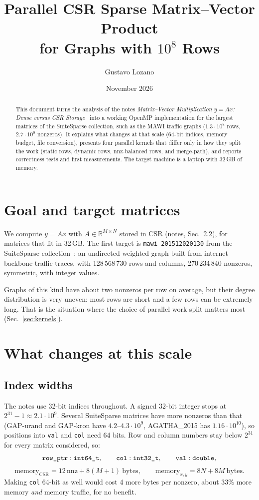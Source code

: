 \documentclass[11pt,a4paper]{article}
\title{\textbf{Parallel CSR Sparse Matrix--Vector Product\\for Graphs with $10^8$ Rows}}
\author{Gustavo Lozano}
\date{November 2026}
\newcommand{\R}{\mathbb{R}}
\begin{document}
\maketitle

\begin{abstract}
This document turns the analysis of the notes \emph{Matrix--Vector Multiplication
$y=Ax$: Dense versus CSR Storage}~\cite{notes} into a working OpenMP implementation for
the largest matrices of the SuiteSparse collection, such as the MAWI traffic graphs
($1.3\cdot10^8$ rows, $2.7\cdot10^8$ nonzeros). It explains what changes at that scale
(64-bit indices, memory budget, file conversion), presents four parallel kernels that
differ only in how they split the work (static rows, dynamic rows, nnz-balanced rows, and
merge-path), and reports correctness tests and first measurements. The target machine is a
laptop with 32\,GB of memory.
\end{abstract}

\tableofcontents

\section{Goal and target matrices}
We compute $y = Ax$ with $A\in\R^{M\times N}$ stored in CSR (notes, Sec.~2.2), for
matrices that fit in 32\,GB. The first target is \texttt{mawi\_201512020130} from the
SuiteSparse collection~\cite{suitesparse}: an undirected weighted graph built from
internet backbone traffic traces, with 128\,568\,730 rows and columns, 270\,234\,840
nonzeros, symmetric, with integer values.

Graphs of this kind have about two nonzeros per row on average, but their degree
distribution is very uneven: most rows are short and a few rows can be extremely long. That
is the situation where the choice of parallel work split matters most (Sec.~\ref{sec:kernels}).

\section{What changes at this scale}

\subsection{Index widths}
The notes use 32-bit indices throughout. A signed 32-bit integer stops at
$2^{31}-1\approx2.1\cdot10^9$. Several SuiteSparse matrices have more nonzeros than that
(GAP-urand and GAP-kron have $4.2$--$4.3\cdot10^9$, AGATHA\_2015 has $1.16\cdot10^{10}$),
so positions into \texttt{val} and \texttt{col} need 64 bits. Row and column numbers stay
below $2^{31}$ for every matrix considered, so:
\[
  \texttt{row\_ptr}: \text{\texttt{int64\_t}},\qquad
  \texttt{col}: \text{\texttt{int32\_t}},\qquad
  \texttt{val}: \text{\texttt{double}},
\]
\[
  \text{memory}_{\text{CSR}} = 12\,\text{nnz} + 8(M+1)\ \text{bytes},\qquad
  \text{memory}_{x,y} = 8N + 8M\ \text{bytes}.
\]
Making \texttt{col} 64-bit as well would cost 4 more bytes per nonzero, about 33\% more
memory \emph{and} memory traffic, for no benefit.
\end{document}

